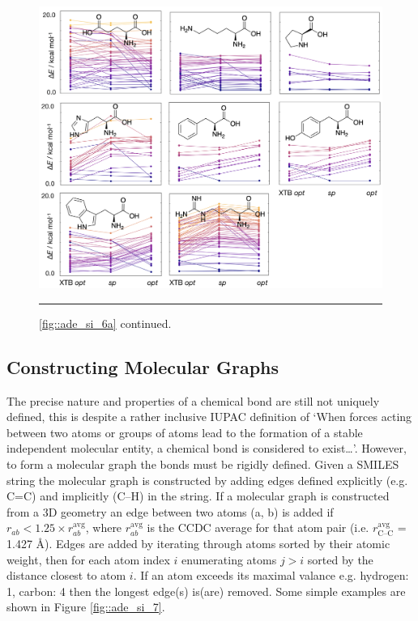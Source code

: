 \documentclass[../../main.tex]{subfiles}
\begin{document}
\begin{figure}[h!]
	\vspace{0.4cm}
	\centering
	\includegraphics[width=\textwidth]{5/autode/figs/figS6b}
	\vspace{0.4cm}
	\hrule
	\caption{\figurename{ }\ref{fig::ade_si_6a} continued.}
	\label{fig::ade_si_6b}
\end{figure}

\clearpage
\subsection{Constructing Molecular Graphs}

The precise nature and properties of a chemical bond are still not uniquely defined,\cite{Zhao2019} this is despite a rather inclusive IUPAC definition of ‘When forces acting between two atoms or groups of atoms lead to the formation of a stable independent molecular entity, a chemical bond is considered to exist…’.\cite{IUPACgoldbook} However, to form a molecular graph the bonds must be rigidly defined. Given a SMILES string the molecular graph is constructed by adding edges defined explicitly (e.g. C=C) and implicitly (C--H) in the string. If a molecular graph is constructed from a 3D geometry an edge between two atoms (a, b) is added if $r_{ab} < 1.25 \times r^\text{avg}_{ab}$, where $r^\text{avg}_{ab}$ is the CCDC average for that atom pair (i.e. $r^\text{avg}_\text{C--C}$ = 1.427 \AA). Edges are added by iterating through atoms sorted by their atomic weight, then for each atom index $i$ enumerating atoms $j > i$ sorted by the distance closest to atom $i$. If an atom exceeds its maximal valance e.g. hydrogen: 1, carbon: 4 then the longest edge(s) is(are) removed. Some simple examples are shown in Figure \ref{fig::ade_si_7}. 
\end{document}
